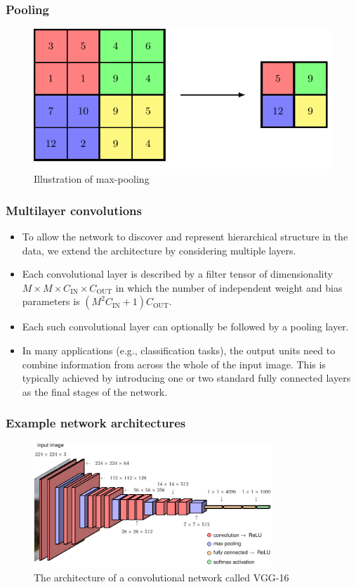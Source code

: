 \documentclass{beamer}
\begin{document}
\begin{frame}
    \frametitle{Pooling}
    \begin{figure}
        \caption{Illustration of max-pooling}
        \includegraphics{Figure_8.pdf}
    \end{figure}
\end{frame}

\begin{frame}
    \frametitle{Multilayer convolutions}
    \begin{itemize}
        \item To allow the network to discover and represent hierarchical structure in the data, we extend the architecture by considering multiple layers.
        \item Each convolutional layer is described by a filter tensor of dimensionality $M\times{}M\times{}C_{\textrm{IN}}\times{}C_{\textrm{OUT}}$ in which the number of independent weight and bias parameters is $(M^{2}C_{\textrm{IN}}+1)C_{\textrm{OUT}}$.
        \item Each such convolutional layer can optionally be followed by a pooling layer.
        \item In many applications (e.g., classification tasks), the output units need to combine information from across the whole of the input image. This is typically achieved by introducing one or two standard fully connected layers as the final stages of the network.
    \end{itemize}
\end{frame}

\begin{frame}
    \frametitle{Example network architectures}
    \begin{figure}
        \caption{The architecture of a convolutional network called VGG-16}
        \includegraphics[width=0.8\textwidth]{Figure_10.pdf}
    \end{figure}
\end{frame}
\end{document}
